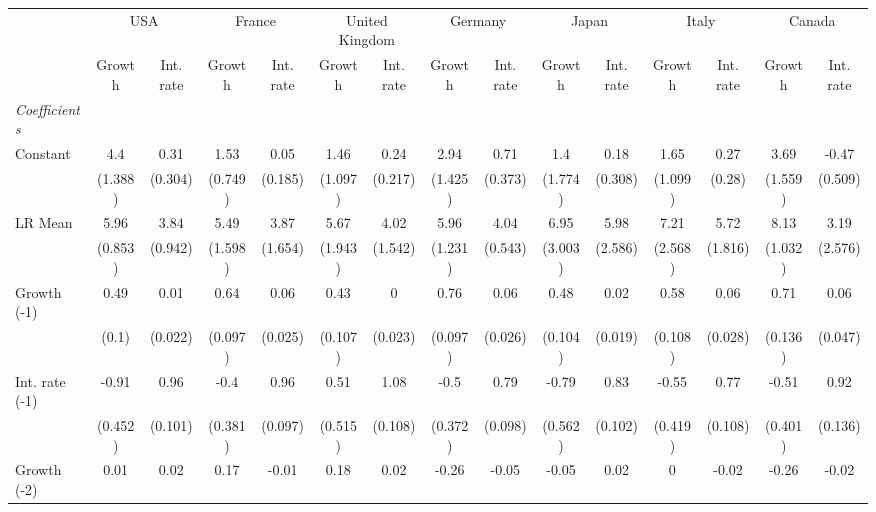\begin{table}[htbp] 
	\centering
	 \scriptsize
	\begin{tabular}{@{\extracolsep{4pt}}lcccccccccccccc@{}}		\hline\hline
		 		 & \multicolumn{2}{c}{USA} &\multicolumn{2}{c}{France} &\multicolumn{2}{c}{United Kingdom} &\multicolumn{2}{c}{Germany} &\multicolumn{2}{c}{Japan} &\multicolumn{2}{c}{Italy} &\multicolumn{2}{c}{Canada} \\ 
 		 & Growth 	 & Int. rate 	 & Growth 	 & Int. rate 	 & Growth 	 & Int. rate 	 & Growth 	 & Int. rate 	 & Growth 	 & Int. rate 	 & Growth 	 & Int. rate 	 & Growth 	 & Int. rate\\\cline{2-3}\cline{4-5}\cline{6-7}\cline{8-9}\cline{10-11}\cline{12-13}\cline{14-15}
\rule{0pt}{4ex} 
 \emph{Coefficients} 	  		 & 		 & 		 & 		 & 		 & 		 & 		 & 		 & 		 & 		 & 		 & 		 & 		 & 		 &\\ 
\quad Constant 	 & 4.4 	 & 0.31 	 & 1.53 	 & 0.05 	 & 1.46 	 & 0.24 	 & 2.94 	 & 0.71 	 & 1.4 	 & 0.18 	 & 1.65 	 & 0.27 	 & 3.69 	 & -0.47	 \\ 
 		 & (1.388) 	 & (0.304) 	 & (0.749) 	 & (0.185) 	 & (1.097) 	 & (0.217) 	 & (1.425) 	 & (0.373) 	 & (1.774) 	 & (0.308) 	 & (1.099) 	 & (0.28) 	 & (1.559) 	 & (0.509) 	 \\ 
\quad LR Mean 	 & 5.96 	 & 3.84 	 & 5.49 	 & 3.87 	 & 5.67 	 & 4.02 	 & 5.96 	 & 4.04 	 & 6.95 	 & 5.98 	 & 7.21 	 & 5.72 	 & 8.13 	 & 3.19	 \\ 
 		 & (0.853) 	 & (0.942) 	 & (1.598) 	 & (1.654) 	 & (1.943) 	 & (1.542) 	 & (1.231) 	 & (0.543) 	 & (3.003) 	 & (2.586) 	 & (2.568) 	 & (1.816) 	 & (1.032) 	 & (2.576) 	 \\ 
\quad Growth (-1) 	 &0.49 	 & 0.01 	 & 0.64 	 & 0.06 	 & 0.43 	 & 0 	 & 0.76 	 & 0.06 	 & 0.48 	 & 0.02 	 & 0.58 	 & 0.06 	 & 0.71 	 & 0.06	 \\ 
 		 & (0.1) 	 & (0.022) 	 & (0.097) 	 & (0.025) 	 & (0.107) 	 & (0.023) 	 & (0.097) 	 & (0.026) 	 & (0.104) 	 & (0.019) 	 & (0.108) 	 & (0.028) 	 & (0.136) 	 & (0.047) 	 \\ 
\quad Int. rate (-1) 	 &-0.91 	 & 0.96 	 & -0.4 	 & 0.96 	 & 0.51 	 & 1.08 	 & -0.5 	 & 0.79 	 & -0.79 	 & 0.83 	 & -0.55 	 & 0.77 	 & -0.51 	 & 0.92	 \\ 
 		 & (0.452) 	 & (0.101) 	 & (0.381) 	 & (0.097) 	 & (0.515) 	 & (0.108) 	 & (0.372) 	 & (0.098) 	 & (0.562) 	 & (0.102) 	 & (0.419) 	 & (0.108) 	 & (0.401) 	 & (0.136) 	 \\ 
\quad Growth (-2) 	 &0.01 	 & 0.02 	 & 0.17 	 & -0.01 	 & 0.18 	 & 0.02 	 & -0.26 	 & -0.05 	 & -0.05 	 & 0.02 	 & 0 	 & -0.02 	 & -0.26 	 & -0.02	 \\ 

\end{tabular}
\end{table}
